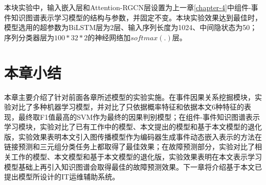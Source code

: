 本块实验中，输入嵌入层和Attention-RGCN层设置为上一章\ref{chapter-4}中组件-事件知识图谱表示学习模型的结构与参数，并固定不变。本块实验效果达到最佳时，模型选用的超参数为BiLSTM层为2层、输入序列长度为1024、中间隐状态为50；序列分类器层为$100*32*2$的神经网络加$softmax(.)$层。

\section{本章小结}
本章主要介绍了针对前面各章所述模型的实验实施。在事件因果关系挖掘模块，实验对比了多种机器学习模型，并对比了只依据概率特征和依据本文6种特征的表现，最终取F1值最高的SVM作为最终的因果判别模型；在组件-事件知识图谱表示学习模块，实验对比了已有工作中的模型、本文提出的模型和基于本文模型的退化版，实验效果表明本文引入图传播模型作为编码器生成事件动态嵌入表示的方法在链接预测和三元组分类任务上都取得了最佳效果；在故障预测部分，实验对比了相关工作的模型、本文模型和基于本文模型的退化版，实验效果表明在本文表示学习模型基础上再引入知识图谱会取得最佳的故障预测效果。下一章将介绍基于本文已提出模型所设计的IT运维辅助系统。




